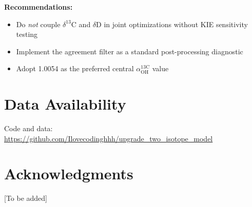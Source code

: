 \documentclass[11pt,twocolumn]{article}
\begin{document}
\noindent\textbf{Recommendations:}
\begin{itemize}
\item Do \emph{not} couple $\delta^{13}$C and $\delta$D in joint optimizations without KIE sensitivity testing
\item Implement the agreement filter as a standard post-processing diagnostic
\item Adopt 1.0054 as the preferred central $\alpha_{\mathrm{OH}}^{13\mathrm{C}}$ value
\end{itemize}

\section*{Data Availability}
Code and data: \url{https://github.com/Ilovecodinghhh/upgrade_two_isotope_model}

\section*{Acknowledgments}
[To be added]



\end{document}
